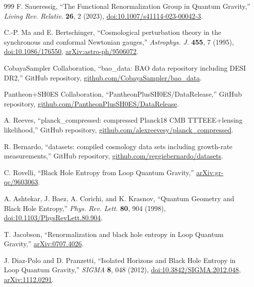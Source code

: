\documentclass[aps,prd,reprint,nofootinbib,superscriptaddress,floatfix]{revtex4-2}
\numberwithin{equation}{section}
\theoremstyle{definition}
\theoremstyle{plain}
\begin{document}
\begin{thebibliography}{999}
F. Saueressig, ``The Functional Renormalization Group in Quantum Gravity,''
\emph{Living Rev. Relativ.} \textbf{26}, 2 (2023),
\href{https://doi.org/10.1007/s41114-023-00042-3}{doi:10.1007/s41114-023-00042-3}.


C.-P. Ma and E. Bertschinger,
``Cosmological perturbation theory in the synchronous and conformal Newtonian gauges,''
\emph{Astrophys. J.} \textbf{455}, 7 (1995),
\href{https://doi.org/10.1086/176550}{doi:10.1086/176550},
\href{https://arxiv.org/abs/astro-ph/9506072}{arXiv:astro-ph/9506072}.

CobayaSampler Collaboration,
``bao\_data: BAO data repository including DESI DR2,''
GitHub repository,
\href{https://github.com/CobayaSampler/bao_data}{github.com/CobayaSampler/bao\_data}.

Pantheon+SH0ES Collaboration,
``PantheonPlusSH0ES/DataRelease,''
GitHub repository,
\href{https://github.com/PantheonPlusSH0ES/DataRelease}{github.com/PantheonPlusSH0ES/DataRelease}.

A. Reeves,
``planck\_compressed: compressed Planck18 CMB TTTEEE+lensing likelihood,''
GitHub repository,
\href{https://github.com/alexreevesy/planck_compressed}{github.com/alexreevesy/planck\_compressed}.

R. Bernardo,
``datasets: compiled cosmology data sets including growth-rate measurements,''
GitHub repository,
\href{https://github.com/reggiebernardo/datasets}{github.com/reggiebernardo/datasets}.


C. Rovelli,
``Black Hole Entropy from Loop Quantum Gravity,''
\href{https://arxiv.org/abs/gr-qc/9603063}{arXiv:gr-qc/9603063}.

A. Ashtekar, J. Baez, A. Corichi, and K. Krasnov,
``Quantum Geometry and Black Hole Entropy,''
\emph{Phys. Rev. Lett.} \textbf{80}, 904 (1998),
\href{https://doi.org/10.1103/PhysRevLett.80.904}{doi:10.1103/PhysRevLett.80.904}.

T. Jacobson,
``Renormalization and black hole entropy in Loop Quantum Gravity,''
\href{https://arxiv.org/abs/0707.4026}{arXiv:0707.4026}.

J. Diaz-Polo and D. Pranzetti,
``Isolated Horizons and Black Hole Entropy in Loop Quantum Gravity,''
\emph{SIGMA} \textbf{8}, 048 (2012),
\href{https://doi.org/10.3842/SIGMA.2012.048}{doi:10.3842/SIGMA.2012.048},
\href{https://arxiv.org/abs/1112.0291}{arXiv:1112.0291}.


\end{thebibliography}
\end{document}
